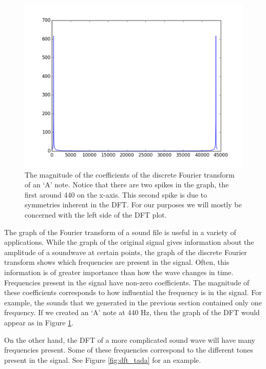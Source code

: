 \begin{center}
\begin{figure}
\includegraphics[scale=0.7]{figures/a_dft}
\caption{The magnitude of the coefficients of the discrete Fourier transform of an `A' note.  Notice that there are two spikes in the graph, the first around 440 on the x-axis.
This second spike is due to symmetries inherent in the DFT.  For our purposes we will mostly be concerned with the left side of the DFT plot.}
\label{fig:dft_a}
\end{figure}
\end{center}

The graph of the Fourier transform of a sound file is useful in a variety of applications.
While the graph of the original signal gives information about the amplitude of a soundwave at certain points, the graph of the discrete Fourier transform
shows which frequencies are present in the signal.  Often, this information is of greater importance than how the wave changes in time.
Frequencies present in the signal have non-zero coefficients.
The magnitude of these coefficients corresponds to how influential the frequency is in the signal.
For example, the sounds that we generated in the previous section contained only one frequency.
If we created an `A' note at 440 Hz, then the graph of the DFT would appear as in Figure \ref{fig:dft_a}.

On the other hand, the DFT of a more complicated sound wave will have many frequencies present.
Some of these frequencies correspond to the different tones present in the signal.
See Figure \ref{fig:dft_tada} for an example.

